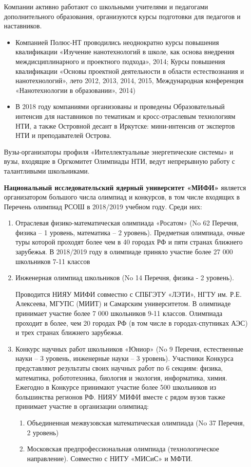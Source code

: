Компании активно работают со школьными учителями и педагогами дополнительного образования, организуются курсы подготовки для педагогов и наставников.
\begin{itemize}
    \item Компанией Полюс-НТ проводились неоднократно курсы повышения квалификации «Изучение нанотехнологий в школе, как основа внедрения междисциплинарного и проектного подхода», 2014; Курсы повышения квалификации «Основы проектной деятельности в области естествознания и нанотехнологий», лето 2012, 2013, 2014, 2015, Международная конференция «Нанотехнологии в образовании», 2014)
    \item В 2018 году компаниями организованы и проведены Образовательный интенсив для наставников по тематикам и кросс-отраслевым технологиям НТИ, а также Островной десант в Иркутске: мини-интенсив от экспертов НТИ и преподавателей Острова.
\end{itemize}

Вузы-организаторы профиля «Интеллектуальные энергетические системы» и вузы, входящие в Оргкомитет Олимпиады НТИ, ведут непрерывную работу с талантливыми школьниками.

\textbf{Национальный исследовательский ядерный университет «МИФИ»} является организатором большого числа олимпиад и конкурсов, в том числе входящих в Перечень олимпиад РСОШ в 2018/2019 учебном году. Среди них:
\begin{enumerate}
    \item Отраслевая физико-математическая олимпиада «Росатом» (No 62 Перечня, физика – 1 уровень, математика – 2 уровень). Предметная олимпиада, очные туры которой проходят более чем в 40 городах РФ и пяти странах ближнего зарубежья. В 2018/2019 году в олимпиаде приняло участие более 27 000 школьников 7-11 классов
    \item Инженерная олимпиад школьников (No 14 Перечня, физика - 2 уровень).
    
    Проводится НИЯУ МИФИ совместно с СПБГЭТУ «ЛЭТИ», НГТУ им. Р.Е. Алексеева, МГУПС (МИИТ) и Самарским университетом. В олимпиаде принимает участие более 7 000 школьников 9-11 классов. Олимпиада проходит в более, чем 20 городах РФ (в том числе в городах-спутниках АЭС) и трех странах ближнего зарубежья. 
    \item Конкурс научных работ школьников «Юниор» (No 9 Перечня, естественные науки – 3 уровень, инженерные науки – 3 уровень). Участники Конкурса представляют результаты своих научных работ по 6 секциям: физика, математика, робототехника, биология и экология, информатика, химия. Ежегодно в Конкурсе принимают участие более 500 школьников из большинства регионов РФ. НИЯУ МИФИ вместе с рядом вузов также принимает участие в организации олимпиад:
    \begin{enumerate}
        \item Объединенная межвузовская математическая олимпиада (No 37 Перечня, 2 уровень)
        \item Московская предпрофессиональная олимпиада (технологическое направление). Совместно с НИТУ «МИСиС» и МФТИ.
    \end{enumerate}
\end{enumerate}

